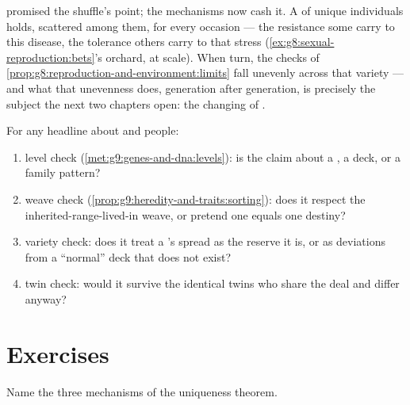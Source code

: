 \begin{proposition}\label{prop:g9:unique-individuals:reserve}
 promised the
shuffle's point; the mechanisms now cash it. A  of
unique individuals holds, scattered among them, 
for every occasion --- the resistance some carry to this
disease, the tolerance others carry to that stress
(\cref{ex:g8:sexual-reproduction:bets}'s orchard, at
 scale). When  turn, the checks of
\cref{prop:g8:reproduction-and-environment:limits} fall
unevenly across that variety --- and what that unevenness
does, generation after generation, is precisely the
subject the next two chapters open: the changing of
.
\end{proposition}
\admitted

\begin{method}\label{met:g9:unique-individuals:claims}
For any headline about  and people:
\begin{enumerate}
  \item level check (\cref{met:g9:genes-and-dna:levels}):
        is the claim about a , a deck, or a family
        pattern?
  \item weave check
        (\cref{prop:g9:heredity-and-traits:sorting}): does
        it respect the inherited-range-lived-in weave, or
        pretend one  equals one destiny?
  \item variety check: does it treat a 's spread
        as the reserve it is, or as deviations from a
        ``normal'' deck that does not exist?
  \item twin check: would it survive the identical twins
        who share the deal and differ anyway?
\end{enumerate}
\end{method}

\section{Exercises}

\begin{exercise}[$\star$]\label{exo:g9:unique-individuals:1}
Name the three mechanisms of the uniqueness theorem.
\end{exercise}

